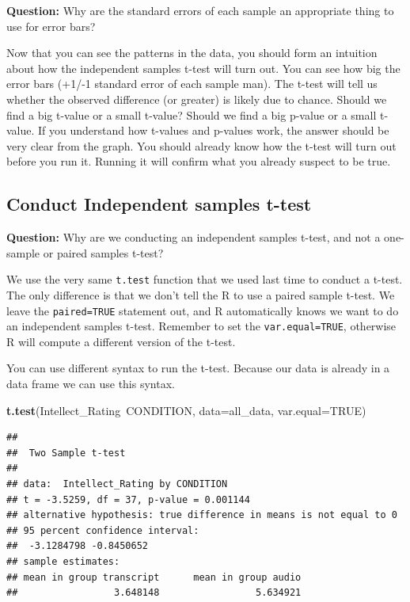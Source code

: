 \documentclass[]{book}
\newenvironment{Shaded}{\begin{snugshade}}{\end{snugshade}}
\newcommand{\KeywordTok}[1]{\textcolor[rgb]{0.13,0.29,0.53}{\textbf{{#1}}}}
\newcommand{\DataTypeTok}[1]{\textcolor[rgb]{0.13,0.29,0.53}{{#1}}}
\newcommand{\OtherTok}[1]{\textcolor[rgb]{0.56,0.35,0.01}{{#1}}}
\newcommand{\NormalTok}[1]{{#1}}
\theoremstyle{definition}
\theoremstyle{definition}
\theoremstyle{definition}
\theoremstyle{remark}
\begin{document}
\textbf{Question:} Why are the standard errors of each sample an
appropriate thing to use for error bars?

Now that you can see the patterns in the data, you should form an
intuition about how the independent samples t-test will turn out. You
can see how big the error bars (+1/-1 standard error of each sample
man). The t-test will tell us whether the observed difference (or
greater) is likely due to chance. Should we find a big t-value or a
small t-value? Should we find a big p-value or a small t-value. If you
understand how t-values and p-values work, the answer should be very
clear from the graph. You should already know how the t-test will turn
out before you run it. Running it will confirm what you already suspect
to be true.

\subsection{Conduct Independent samples
t-test}\label{conduct-independent-samples-t-test}

\textbf{Question:} Why are we conducting an independent samples t-test,
and not a one-sample or paired samples t-test?

We use the very same \texttt{t.test} function that we used last time to
conduct a t-test. The only difference is that we don't tell the R to use
a paired sample t-test. We leave the \texttt{paired=TRUE} statement out,
and R automatically knows we want to do an independent samples t-test.
Remember to set the \texttt{var.equal=TRUE}, otherwise R will compute a
different version of the t-test.

You can use different syntax to run the t-test. Because our data is
already in a data frame we can use this syntax.

\begin{Shaded}
\begin{Highlighting}[]
\KeywordTok{t.test}\NormalTok{(Intellect_Rating~CONDITION, }\DataTypeTok{data=}\NormalTok{all_data, }\DataTypeTok{var.equal=}\OtherTok{TRUE}\NormalTok{)}
\end{Highlighting}
\end{Shaded}

\begin{verbatim}
## 
##  Two Sample t-test
## 
## data:  Intellect_Rating by CONDITION
## t = -3.5259, df = 37, p-value = 0.001144
## alternative hypothesis: true difference in means is not equal to 0
## 95 percent confidence interval:
##  -3.1284798 -0.8450652
## sample estimates:
## mean in group transcript      mean in group audio 
##                 3.648148                 5.634921
\end{verbatim}
\end{document}
